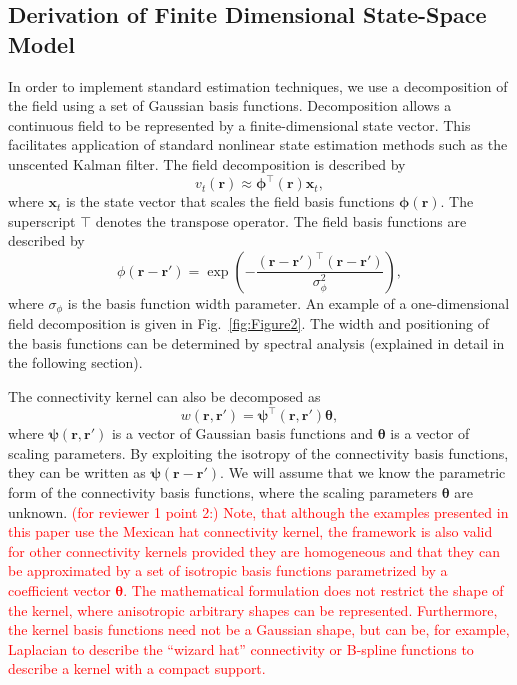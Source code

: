 \documentclass[review,authoryear,3p]{elsarticle}
\newcommand{\dean}[1]{\textcolor{red}{#1}}
\begin{document}
\subsection{Derivation of Finite Dimensional State-Space Model}\label{Sect:ReducedModelDerivation}
In order to implement standard estimation techniques, we use a decomposition of the field using a set of Gaussian basis functions. Decomposition allows a continuous field to be represented by a finite-dimensional state vector. This facilitates application of standard nonlinear state estimation methods such as the unscented Kalman filter. The field decomposition is described by
\begin{equation}
	\label{DefFieldDecomp} v_t\left(\mathbf{r}\right) \approx \boldsymbol{\phi}^{\top}\left(\mathbf{r}\right) \mathbf{x}_t, 
\end{equation}
where $\mathbf{x}_t$ is the state vector that scales the field basis functions $\mathbf{\boldsymbol{\phi}}(\mathbf{r})$. The superscript $\top$ denotes the transpose operator. The field basis functions are described by
\begin{equation}\label{eq:FieldBasisFunction}
	\phi\left(\mathbf{r}-\mathbf{r}'\right) =
\exp{\left(-\frac{(\mathbf{r}-\mathbf{r}')^\top(\mathbf{r}-\mathbf{r}')}{\sigma_{\phi}^2}\right)}, 
\end{equation}
where $\sigma_{\phi}$ is the basis function width parameter. An example of a one-dimensional field decomposition is given in Fig.~\ref{fig:Figure2}. The width and positioning of the basis functions can be determined by spectral analysis (explained in detail in the following section). 

The connectivity kernel can also be decomposed as 
\begin{equation}\label{DefKernelDecomp}
	 w\left(\mathbf{r},\mathbf{r}'\right) =\boldsymbol{\psi}^\top\left(\mathbf{r},\mathbf{r}'\right) \boldsymbol{\theta},
\end{equation}
where $\boldsymbol{\psi}(\mathbf{r},\mathbf{r}')$ is a vector of Gaussian basis functions and $\boldsymbol{\theta}$ is a vector of scaling parameters. By exploiting the isotropy of the connectivity basis functions, they can be written as  
$\boldsymbol{\psi}(\mathbf{r}-\mathbf{r}')$. We will assume that we know the parametric form of the connectivity basis functions, where the scaling parameters $\boldsymbol{\theta}$ are unknown. 
\dean{(for reviewer 1 point 2:) Note, that although the examples presented in this paper use the Mexican hat connectivity kernel, the framework is also valid for other connectivity kernels provided they are homogeneous and that they can be approximated by a set of isotropic basis functions parametrized by a coefficient vector $\mathbf{\theta}$. The mathematical formulation does not restrict the shape of the kernel, where anisotropic arbitrary shapes can be represented. Furthermore, the kernel basis functions need not be a Gaussian shape, but can be, for example, Laplacian to describe the ``wizard hat'' connectivity or B-spline functions to describe a kernel with a compact support.}
\end{document}
